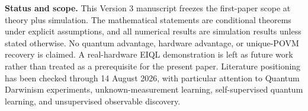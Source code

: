 \documentclass[11pt]{article}
\begin{document}
\textbf{Status and scope.} This Version 3 manuscript freezes the first-paper scope at theory plus simulation. The mathematical statements are conditional theorems under explicit assumptions, and all numerical results are simulation results unless stated otherwise. No quantum advantage, hardware advantage, or unique-POVM recovery is claimed. A real-hardware EIQL demonstration is left as future work rather than treated as a prerequisite for the present paper. Literature positioning has been checked through 14 August 2026, with particular attention to Quantum Darwinism experiments, unknown-measurement learning, self-supervised quantum learning, and unsupervised observable discovery.

\tableofcontents
\newpage






\end{document}
